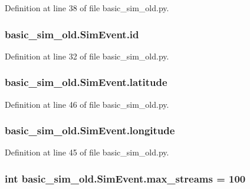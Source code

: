 Definition at line 38 of file basic\-\_\-sim\-\_\-old.\-py.

\hypertarget{classbasic__sim__old_1_1_sim_event_a5c0d91c14f018c2ddd192e6a26767d79}{
\subsubsection[{id}]{\setlength{\rightskip}{0pt plus 5cm}basic\-\_\-sim\-\_\-old.\-Sim\-Event.\-id}}\label{classbasic__sim__old_1_1_sim_event_a5c0d91c14f018c2ddd192e6a26767d79}


Definition at line 32 of file basic\-\_\-sim\-\_\-old.\-py.

\hypertarget{classbasic__sim__old_1_1_sim_event_a4d9d58c5b1062e326ed76c1fb29f51f7}{
\subsubsection[{latitude}]{\setlength{\rightskip}{0pt plus 5cm}basic\-\_\-sim\-\_\-old.\-Sim\-Event.\-latitude}}\label{classbasic__sim__old_1_1_sim_event_a4d9d58c5b1062e326ed76c1fb29f51f7}


Definition at line 46 of file basic\-\_\-sim\-\_\-old.\-py.

\hypertarget{classbasic__sim__old_1_1_sim_event_a1c0402df96ecafb9ba8ecb7d6e59f329}{
\subsubsection[{longitude}]{\setlength{\rightskip}{0pt plus 5cm}basic\-\_\-sim\-\_\-old.\-Sim\-Event.\-longitude}}\label{classbasic__sim__old_1_1_sim_event_a1c0402df96ecafb9ba8ecb7d6e59f329}


Definition at line 45 of file basic\-\_\-sim\-\_\-old.\-py.

\hypertarget{classbasic__sim__old_1_1_sim_event_a06109f4e9dc7bd1249d8cbbc910c623d}{
\subsubsection[{max\-\_\-streams}]{\setlength{\rightskip}{0pt plus 5cm}int basic\-\_\-sim\-\_\-old.\-Sim\-Event.\-max\-\_\-streams = 100\hspace{0.3cm}{\ttfamily [static]}}}\label{classbasic__sim__old_1_1_sim_event_a06109f4e9dc7bd1249d8cbbc910c623d}


